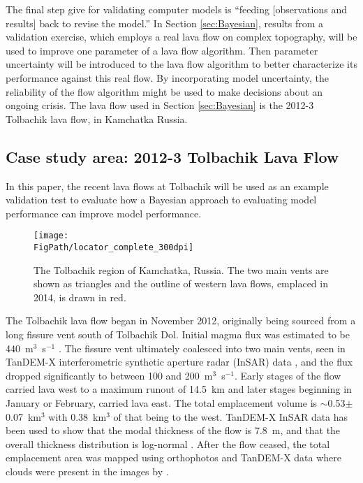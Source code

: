 	The final step \citet{bayarri2007framework} give for validating computer models is ``feeding [observations and results] back to revise the model.'' In Section \ref{sec:Bayesian}, results from a validation exercise, which employs a real lava flow on complex topography, will be used to improve one parameter of a lava flow algorithm. Then parameter uncertainty will be introduced to the lava flow algorithm to better characterize its performance against this real flow. By incorporating model uncertainty, the reliability of the flow algorithm might be used to make decisions about an ongoing crisis. The lava flow used in Section \ref{sec:Bayesian} is the 2012-3 Tolbachik lava flow, in Kamchatka Russia.
	
	\subsection{Case study area: 2012-3 Tolbachik Lava Flow}\label{sec_tolb_back}
	In this paper, the recent lava flows at Tolbachik will be used as an example validation test to evaluate how a Bayesian approach to evaluating model performance can improve model performance. 
	
\begin{figure}[!h]
	\centering
	\texttt{[image: \\FigPath/locator\_complete\_300dpi]}
	\caption[The Tolbachik region of Kamchatka, Russia]{The Tolbachik region of Kamchatka, Russia. The two main vents are shown as triangles and the outline of western lava flows, emplaced in 2014, is drawn in red.}
	\label{fig_locator}
\end{figure}
	
The Tolbachik lava flow began in November 2012, originally being sourced from a long fissure vent south of Tolbachik Dol. Initial magma flux was estimated to be 440~m$^3$~s$^{-1}$ \citep{belousov2015overview}. The fissure vent ultimately coalesced into two main vents, seen in TanDEM-X interferometric synthetic aperture radar (InSAR) data \citep{kubanek2015lava}, and the flux dropped significantly to between 100 and 200~m$^3$~s$^{-1}$. Early stages of the flow carried lava west to a maximum runout of 14.5~km and later stages beginning in January or February, carried lava east. The total emplacement volume is $\sim$0.53$\pm$0.07~km$^3$ with 0.38~km$^3$ of that being to the west. TanDEM-X InSAR data has been used to show that the modal thickness of the flow is 7.8~m, and that the overall thickness distribution is log-normal \citep{kubanek2015lava}. After the flow ceased, the total emplacement area was mapped using orthophotos and TanDEM-X data where clouds were present in the images by \citet{kubanek2015lava}.

